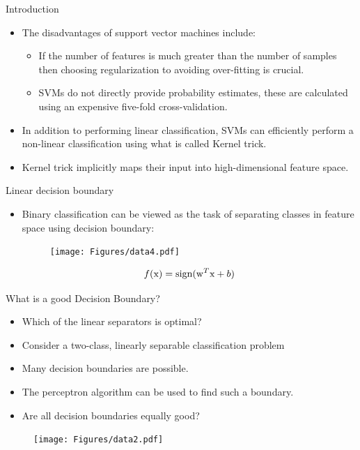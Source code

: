 \begin{frame}{Introduction}
\begin{itemize}
\item The disadvantages of support vector machines include:
\begin{itemize}
\item If the number of features is much greater than the number of samples then choosing regularization to avoiding over-fitting is crucial. 
\item SVMs do not directly provide probability estimates, these are calculated using an expensive five-fold cross-validation.
\end{itemize}
\item In addition to performing linear classification, SVMs can efficiently perform a non-linear classification using what is called {\color{mycolor1}Kernel trick}.
\item Kernel trick implicitly maps their input into high-dimensional feature space.
\end{itemize}
\end{frame}

\begin{frame}{Linear decision boundary}
\begin{itemize}
\item Binary classification can be viewed as the task of separating classes in feature space using decision boundary:
\begin{figure}
\texttt{[image: Figures/data4.pdf]}
\end{figure}
\[f({\rm x})=\text{sign}({\rm w}^T{\rm x}+b)\]
\end{itemize}
\end{frame}

\begin{frame}{What is a good Decision Boundary?}
\begin{itemize}
\item Which of the linear separators is optimal?
\item Consider a two-class, linearly
separable classification problem
\item  Many decision boundaries are possible.
\item  The perceptron algorithm can be
used to find such a boundary.
\item Are all decision boundaries equally
good?
\end{itemize}
\begin{figure}
\texttt{[image: Figures/data2.pdf]}
\end{figure}
\end{frame}

